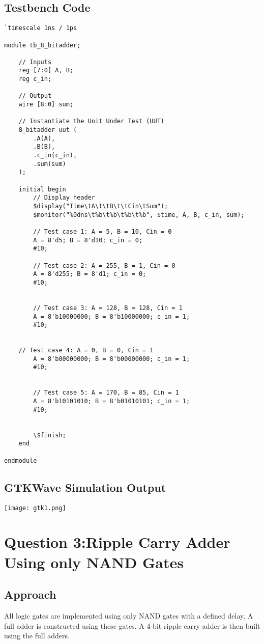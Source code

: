 \documentclass{article}
\begin{document}
\subsection*{Testbench Code}
\begin{verbatim}
`timescale 1ns / 1ps

module tb_8_bitadder;

    // Inputs
    reg [7:0] A, B;
    reg c_in;

    // Output
    wire [8:0] sum;

    // Instantiate the Unit Under Test (UUT)
    8_bitadder uut (
        .A(A),
        .B(B),
        .c_in(c_in),
        .sum(sum)
    );

    initial begin
        // Display header
        $display("Time\tA\t\tB\t\tCin\tSum");
        $monitor("%0dns\t%b\t%b\t%b\t%b", $time, A, B, c_in, sum);

        // Test case 1: A = 5, B = 10, Cin = 0
        A = 8'd5; B = 8'd10; c_in = 0;
        #10;

        // Test case 2: A = 255, B = 1, Cin = 0
        A = 8'd255; B = 8'd1; c_in = 0;
        #10;


        // Test case 3: A = 128, B = 128, Cin = 1
        A = 8'b10000000; B = 8'b10000000; c_in = 1;
        #10;


	// Test case 4: A = 0, B = 0, Cin = 1
        A = 8'b00000000; B = 8'b00000000; c_in = 1;
        #10;


        // Test case 5: A = 170, B = 85, Cin = 1
        A = 8'b10101010; B = 8'b01010101; c_in = 1;
        #10;


        \$finish;
    end

endmodule
\end{verbatim}

\subsection*{GTKWave Simulation Output}

\begin{center}
    \texttt{[image: gtk1.png]}
\end{center}


\newpage

\section*{Question 3:Ripple Carry Adder Using only NAND Gates}

\subsection*{Approach}
All logic gates are implemented using only NAND gates with a defined delay. A full adder is constructed using these gates. A 4-bit ripple carry adder is then built using the full adders.
\end{document}
